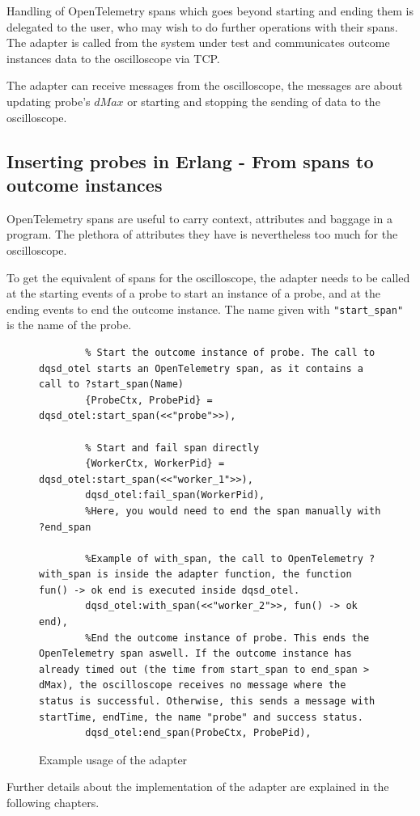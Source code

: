     Handling of OpenTelemetry spans which goes beyond starting and ending them is delegated to the user, who may wish to do further operations with their spans. 
    The adapter is called from the system under test and communicates outcome instances data to the oscilloscope via TCP. 
    
    The adapter can receive messages from the oscilloscope, the messages are about updating probe's $dMax$ or starting and stopping the sending of data to the oscilloscope.
    \subsection{Inserting probes in Erlang - From spans to outcome instances}
        OpenTelemetry spans are useful to carry context, attributes and baggage in a program. The plethora of attributes they have is nevertheless too much for the oscilloscope. \cite{otel-dt}

        To get the equivalent of spans for the oscilloscope, the adapter needs to be called at the starting events of a probe to start an instance of a probe, and at the ending events to end the outcome instance. The name given with \texttt{"start\_span"} is the name of the probe.

     
\begin{figure}[!ht]
\centering
   \begin{verbatim}
        % Start the outcome instance of probe. The call to dqsd_otel starts an OpenTelemetry span, as it contains a call to ?start_span(Name)
        {ProbeCtx, ProbePid} = dqsd_otel:start_span(<<"probe">>),  

        % Start and fail span directly
        {WorkerCtx, WorkerPid} = dqsd_otel:start_span(<<"worker_1">>),   
        dqsd_otel:fail_span(WorkerPid),
        %Here, you would need to end the span manually with ?end_span

        %Example of with_span, the call to OpenTelemetry ?with_span is inside the adapter function, the function fun() -> ok end is executed inside dqsd_otel.
        dqsd_otel:with_span(<<"worker_2">>, fun() -> ok end), 
        %End the outcome instance of probe. This ends the OpenTelemetry span aswell. If the outcome instance has already timed out (the time from start_span to end_span > dMax), the oscilloscope receives no message where the status is successful. Otherwise, this sends a message with startTime, endTime, the name "probe" and success status.
        dqsd_otel:end_span(ProbeCtx, ProbePid),
        \end{verbatim}
\caption{Example usage of the adapter}\label{code:adapter}
\end{figure}
    Further details about the implementation of the adapter are explained in the following chapters. 
